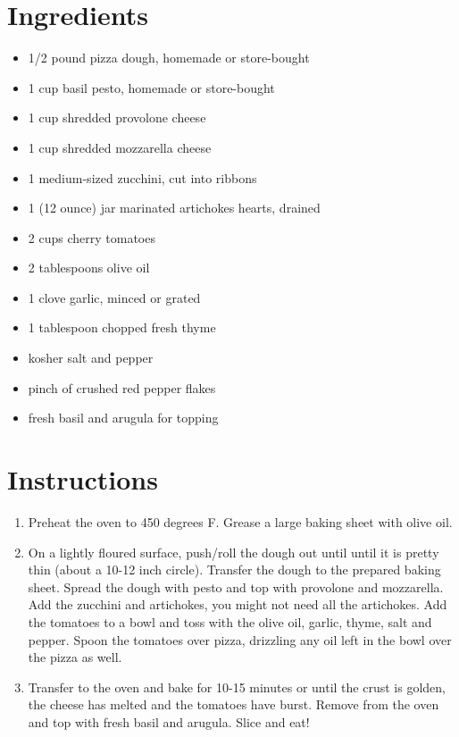 \documentclass[
  letterpaper,
  DIV=11,
  numbers=noendperiod,
  titlepage=false]{scrreprt}
\providecommand{\tightlist}{%
  \setlength{\itemsep}{0pt}\setlength{\parskip}{0pt}}\usepackage{longtable,booktabs,array}
\begin{document}
\section{Ingredients}\label{ingredients-98}

\begin{itemize}
\tightlist
\item
  1/2 pound pizza dough, homemade or store-bought
\item
  1 cup basil pesto, homemade or store-bought
\item
  1 cup shredded provolone cheese
\item
  1 cup shredded mozzarella cheese
\item
  1 medium-sized zucchini, cut into ribbons
\item
  1 (12 ounce) jar marinated artichokes hearts, drained
\item
  2 cups cherry tomatoes
\item
  2 tablespoons olive oil
\item
  1 clove garlic, minced or grated
\item
  1 tablespoon chopped fresh thyme
\item
  kosher salt and pepper
\item
  pinch of crushed red pepper flakes
\item
  fresh basil and arugula for topping
\end{itemize}

\section{Instructions}\label{instructions-98}

\begin{enumerate}
\def\labelenumi{\arabic{enumi}.}
\tightlist
\item
  Preheat the oven to 450 degrees F. Grease a large baking sheet with
  olive oil.
\item
  On a lightly floured surface, push/roll the dough out until until it
  is pretty thin (about a 10-12 inch circle). Transfer the dough to the
  prepared baking sheet. Spread the dough with pesto and top with
  provolone and mozzarella. Add the zucchini and artichokes, you might
  not need all the artichokes. Add the tomatoes to a bowl and toss with
  the olive oil, garlic, thyme, salt and pepper. Spoon the tomatoes over
  pizza, drizzling any oil left in the bowl over the pizza as well.
\item
  Transfer to the oven and bake for 10-15 minutes or until the crust is
  golden, the cheese has melted and the tomatoes have burst. Remove from
  the oven and top with fresh basil and arugula. Slice and eat!
\end{enumerate}
\end{document}
